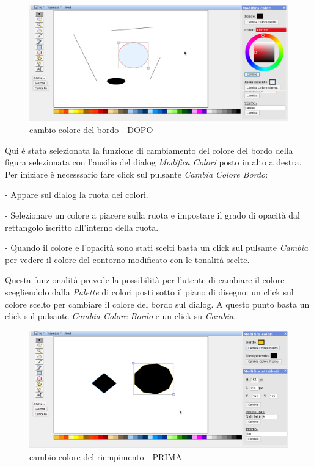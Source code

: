 \begin{figure}[!ht]
\centering
\includegraphics[scale=4]{images/colore_bordo_dopo.png}
\caption{cambio colore del bordo  - DOPO}
\end{figure} 


\vspace{100pt}
Qui \`e stata selezionata la funzione di cambiamento del colore del bordo della figura selezionata con l'ausilio del dialog \textit{Modifica Colori} posto in alto a destra. Per iniziare \`e necesssario fare click sul pulsante \textit{Cambia Colore Bordo}: 
\begin{elencopuntato}[\normindent]
\item[-] Appare sul dialog la ruota dei colori.
\item[-] Selezionare un colore a piacere sulla ruota e impostare il grado di opacit\`a dal rettangolo iscritto all'interno della ruota. 
\item[-]Quando il colore e l'opacit\`a sono stati scelti basta un click sul pulsante \textit{Cambia} per vedere il colore del contorno modificato con le tonalit\`a scelte. 
\end{elencopuntato}
Questa funzionalit\`a prevede la possibilit\`a per l'utente di cambiare il colore scegliendolo dalla \textit{Palette} di colori posti sotto il piano di disegno: un click sul colore scelto per cambiare il colore del bordo sul dialog. A questo punto basta un click sul pulsante \textit{Cambia Colore Bordo} e un click su \textit{Cambia}.

\begin{figure}[!ht]
\centering
\includegraphics[scale=4]{images/colore_riempimento_prima.png}
\caption{cambio colore del riempimento  - PRIMA}
\end{figure} 

